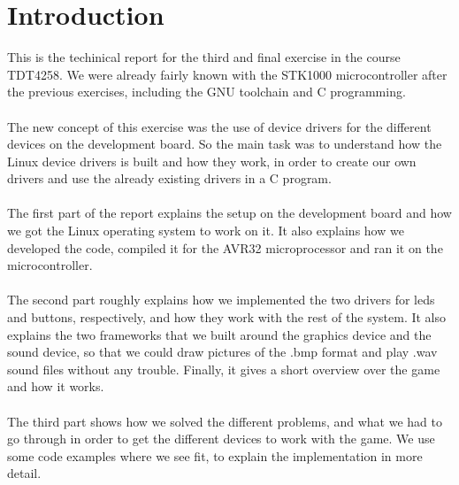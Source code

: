 \section{Introduction}
This is the techinical report for the third and
final exercise in the course TDT4258.
We were already fairly known with the STK1000 
microcontroller after the previous exercises, including the
GNU toolchain and C programming.\\
\\
The new concept of this exercise was the use of device 
drivers for the different devices on the development board.
So the main task was to understand how the Linux device
drivers is built and how they work, in order to create our
own drivers and use the already existing drivers in a C program.\\
\\
The first part of the report explains the setup on the development
board and how we got the Linux operating system to work on it. It
also explains how we developed the code, compiled it for the AVR32 
microprocessor and ran it on the microcontroller.\\
\\
The second part roughly explains how we implemented the two drivers
for leds and buttons, respectively, and how they work with the rest
of the system.
It also explains the two frameworks that we built around the 
graphics device and the sound device, so that we could 
draw pictures of the .bmp format and play .wav sound files without
any trouble. Finally, it gives a short overview over the game and how
it works.\\
\\
The third part shows how we solved the different problems, and what
we had to go through in order to get the different devices to work 
with the game.
We use some code examples where we see fit, to explain the 
implementation in more detail.\\
\\